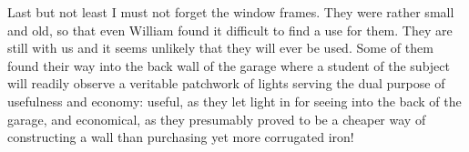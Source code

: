 Last but not least I must not forget the window frames. They were rather small and old, so that even William found it difficult to find a use for them. They are still with us and it seems unlikely that they will ever be used. Some of them found their way into the back wall of the garage where a student of the subject will readily observe a veritable patchwork of lights serving the dual purpose of usefulness and economy: useful, as they let light in for seeing into the back of the garage, and economical, as they presumably proved to be a cheaper way of constructing a wall than purchasing yet more corrugated iron!
